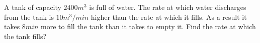
%
%
%
%
% 
% 

\question[4] A tank of capacity $2400m^3$ is full of water. The rate at which water discharges from the tank is $10m^3/min$ higher than the rate at which it fills. As a result it takes $8min$ more to fill the tank than it takes to empty it. Find the rate at which the tank fills?


\ifprintanswers
\fi 

